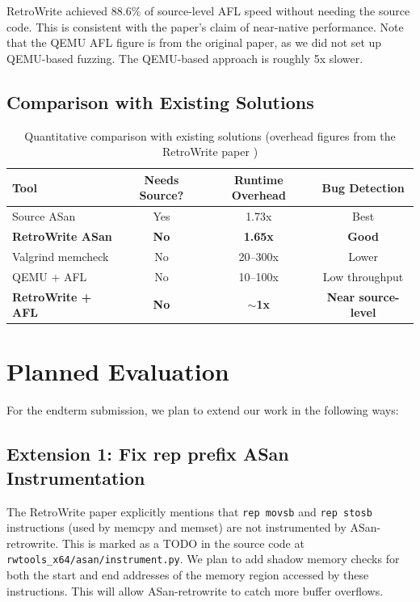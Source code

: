 \documentclass[10pt,a4paper]{article}
\begin{document}
RetroWrite achieved 88.6\% of source-level AFL speed without needing the source code. This is consistent with the paper's claim of near-native performance. Note that the QEMU AFL figure is from the original paper, as we did not set up QEMU-based fuzzing. The QEMU-based approach is roughly 5x slower.

\subsection{Comparison with Existing Solutions}

\begin{table}[H]
\centering
\caption{Quantitative comparison with existing solutions (overhead figures from the RetroWrite paper \cite{retrowrite})}
\label{tab:comparison}
\begin{tabular}{lccc}
\toprule
\textbf{Tool} & \textbf{Needs Source?} & \textbf{Runtime Overhead} & \textbf{Bug Detection} \\
\midrule
\rowcolor{rowgray} Source ASan & Yes & 1.73x & Best \\
\rowcolor{accent!10} \textbf{RetroWrite ASan} & \textbf{No} & \textbf{1.65x} & \textbf{Good} \\
\rowcolor{rowgray} Valgrind memcheck & No & 20--300x & Lower \\
QEMU + AFL & No & 10--100x & Low throughput \\
\rowcolor{accent!10} \textbf{RetroWrite + AFL} & \textbf{No} & $\boldsymbol{\sim}$\textbf{1x} & \textbf{Near source-level} \\
\bottomrule
\end{tabular}
\end{table}

\section{Planned Evaluation}

For the endterm submission, we plan to extend our work in the following ways:

\subsection{Extension 1: Fix rep prefix ASan Instrumentation}
The RetroWrite paper explicitly mentions that \texttt{rep movsb} and \texttt{rep stosb} instructions (used by memcpy and memset) are not instrumented by ASan-retrowrite. This is marked as a TODO in the source code at \texttt{rwtools\_x64/asan/instrument.py}. We plan to add shadow memory checks for both the start and end addresses of the memory region accessed by these instructions. This will allow ASan-retrowrite to catch more buffer overflows.
\end{document}
